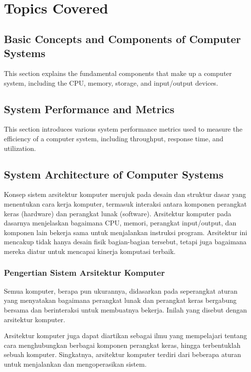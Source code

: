 \documentclass[12pt]{article}
\begin{document}
\section{Topics Covered}

\subsection{Basic Concepts and Components of Computer Systems}
This section explains the fundamental components that make up a computer system, including the CPU, memory, storage, and input/output devices.

\subsection{System Performance and Metrics}
This section introduces various system performance metrics used to measure the efficiency of a computer system, including throughput, response time, and utilization.


\subsection{System Architecture of Computer Systems}


Konsep sistem arsitektur komputer merujuk pada desain dan struktur dasar yang menentukan cara kerja komputer, termasuk interaksi antara komponen perangkat keras (hardware) dan perangkat lunak (software). Arsitektur komputer pada dasarnya menjelaskan bagaimana CPU, memori, perangkat input/output, dan komponen lain bekerja sama untuk menjalankan instruksi program. Arsitektur ini mencakup tidak hanya desain fisik bagian-bagian tersebut, tetapi juga bagaimana mereka diatur untuk mencapai kinerja komputasi terbaik.

\subsubsection{Pengertian Sistem Arsitektur Komputer}


Semua komputer, berapa pun ukurannya, didasarkan pada seperangkat aturan yang menyatakan bagaimana perangkat lunak dan perangkat keras bergabung bersama dan berinteraksi untuk membuatnya bekerja. Inilah yang disebut dengan arsitektur komputer. 


Arsitektur komputer juga dapat diartikan sebagai ilmu yang mempelajari tentang cara menghubungkan berbagai komponen perangkat keras, hingga terbentuklah sebuah komputer. Singkatnya, arsitektur komputer terdiri dari beberapa aturan untuk menjalankan dan mengoperasikan sistem.
\end{document}
